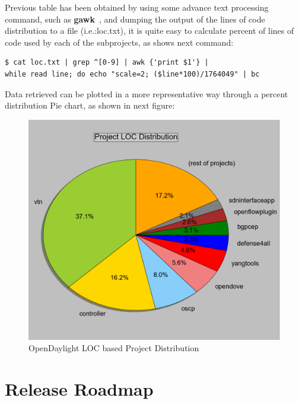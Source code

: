 \documentclass[a4paper, 12pt]{book}
\begin{document}
Previous table has been obtained by using some advance text processing command, such as \textbf{gawk}~\cite{GAWK}, and dumping the output of the lines of code distribution to a file (i.e.:loc.txt), it is quite easy to calculate percent of lines of code used by each of the subprojects, as shows next command:
\begin{verbatim}
$ cat loc.txt | grep ^[0-9] | awk {'print $1'} |
while read line; do echo "scale=2; ($line*100)/1764049" | bc
\end{verbatim}
Data retrieved can be plotted in a more representative way through a percent distribution Pie chart, as shown in next figure:
\begin{figure}[H]
 \begin{center}
   \includegraphics[width=15cm]{img/sloc-project-distritbution-02.png}
   \caption{OpenDaylight LOC based Project Distribution}
   \label{fig:odl_prog_loc_dist_diagram}
 \end{center}
\end{figure}

\section{Release Roadmap}
\label{chap:odltech_technologies}
\end{document}
